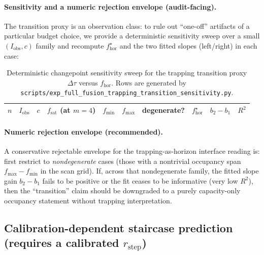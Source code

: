 \paragraph{Sensitivity and a numeric rejection envelope (audit-facing).}
\AuditTag The transition proxy is an observation class: to rule out ``one-off'' artifacts of a particular budget choice, we provide a deterministic sensitivity sweep over a small $(I_{\mathrm{obs}},c)$ family and recompute $f_{\mathrm{hor}}^\star$ and the two fitted slopes (left/right) in each case:
\begin{table}[H]
\centering
\scriptsize
\setlength{\tabcolsep}{5pt}
\renewcommand{\arraystretch}{1.15}
\begin{tabular}{r r r r r r r r r r}
\toprule
$n$ & $I_{\mathrm{obs}}$ & $c$ & $f_{\mathrm{sat}}$ (at $m=4$) & $f_{\min}$ & $f_{\max}$ & degenerate? & $f^\star_{\mathrm{hor}}$ & $b_2-b_1$ & $R^2$ \\
\midrule
%
\end{tabular}
\caption{Deterministic changepoint sensitivity sweep for the trapping transition proxy $\Delta\tau$ versus $f_{\mathrm{hor}}$. Rows are generated by \texttt{scripts/exp\_full\_fusion\_trapping\_transition\_sensitivity.py}.}
\label{tab:full_fusion_trapping_transition_sensitivity}
\end{table}
%

\paragraph{Numeric rejection envelope (recommended).}
\AuditTag A conservative rejectable envelope for the trapping-as-horizon interface reading is:
first restrict to \emph{nondegenerate} cases (those with a nontrivial occupancy span $f_{\max}-f_{\min}$ in the scan grid).
If, across that nondegenerate family, the fitted slope gain $b_2-b_1$ fails to be positive or the fit ceases to be informative (very low $R^2$), then the ``transition'' claim should be downgraded to a purely capacity-only occupancy statement without trapping interpretation.

\subsection{Calibration-dependent staircase prediction (requires a calibrated \texorpdfstring{$r_{\mathrm{step}}$}{r\_step})}
\label{subsec:calibration_dependent_predictions}

